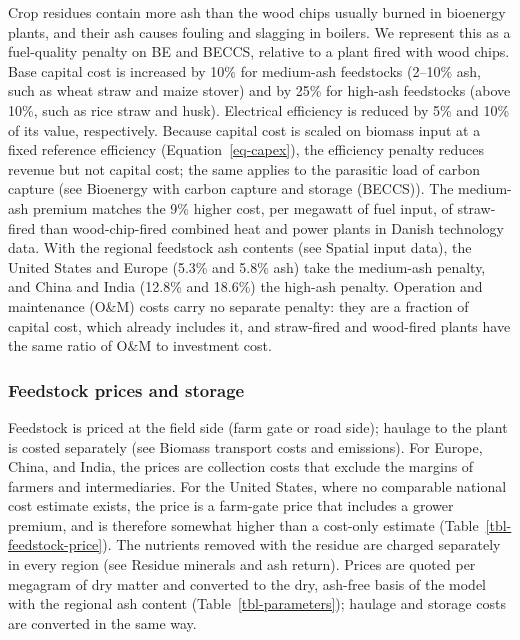 \documentclass[
  letterpaper,
  twoside,
  twocolumn,
  9pt]{article}
\begin{document}
Crop residues contain more ash than the wood chips usually burned in
bioenergy plants, and their ash causes fouling and slagging in
boilers.\citep{baxter1998, garcía2017, luan2025a} We represent this as a
fuel-quality penalty on BE and BECCS, relative to a plant fired with
wood chips. Base capital cost is increased by 10\% for medium-ash
feedstocks (2--10\% ash, such as wheat straw and maize stover) and by
25\% for high-ash feedstocks (above 10\%, such as rice straw and husk).
Electrical efficiency is reduced by 5\% and 10\% of its value,
respectively.\citep{dea2026} Because capital cost is scaled on biomass
input at a fixed reference efficiency (Equation~\ref{eq-capex}), the
efficiency penalty reduces revenue but not capital cost; the same
applies to the parasitic load of carbon capture (see Bioenergy with
carbon capture and storage (BECCS)). The medium-ash premium matches the
9\% higher cost, per megawatt of fuel input, of straw-fired than
wood-chip-fired combined heat and power plants in Danish technology
data.\citep{dea2020} With the regional feedstock ash contents (see
Spatial input data), the United States and Europe (5.3\% and 5.8\% ash)
take the medium-ash penalty, and China and India (12.8\% and 18.6\%) the
high-ash penalty. Operation and maintenance (O\&M) costs carry no
separate penalty: they are a fraction of capital cost, which already
includes it, and straw-fired and wood-fired plants have the same ratio
of O\&M to investment cost.\citep{dea2020}

\subsubsection{Feedstock prices and
storage}\label{feedstock-prices-and-storage}

Feedstock is priced at the field side (farm gate or road side); haulage
to the plant is costed separately (see Biomass transport costs and
emissions). For Europe, China, and India, the prices are collection
costs that exclude the margins of farmers and intermediaries. For the
United States, where no comparable national cost estimate exists, the
price is a farm-gate price that includes a grower premium, and is
therefore somewhat higher than a cost-only estimate
(Table~\ref{tbl-feedstock-price}). The nutrients removed with the
residue are charged separately in every region (see Residue minerals and
ash return). Prices are quoted per megagram of dry matter and converted
to the dry, ash-free basis of the model with the regional ash content
(Table~\ref{tbl-parameters}); haulage and storage costs are converted in
the same way.
\end{document}
